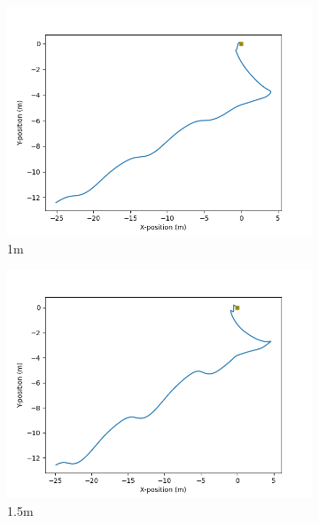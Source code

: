 \documentclass[class=article, crop=false]{standalone}
\begin{document}
\begin{figure}
\begin{subfigure}[b]{0.48\textwidth}
        \includegraphics{scenario1/rov-50m/1.0m/usv_position_uncontrolled}
        \caption{1m}
        \label{}
    \end{subfigure}
    \hfill
    \begin{subfigure}[b]{0.48\textwidth}
        \centering
        \includegraphics{scenario1/rov-50m/1.5m/usv_position_uncontrolled}
        \caption{1.5m}
        \label{}
    \end{subfigure}
    \vfill
    \begin{subfigure}[b]{0.48\textwidth}
        \centering

\end{subfigure}
\end{figure}
\end{document}

